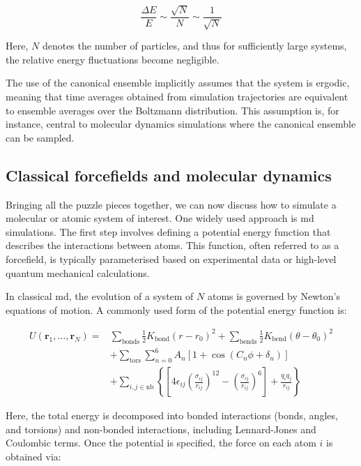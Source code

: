 \begin{equation}
    \frac{\Delta E}{E} \sim \frac{\sqrt{N}}{N} \sim \frac{1}{\sqrt{N}}
\end{equation}

Here, $N$ denotes the number of particles, and thus for sufficiently large systems, the relative energy fluctuations become negligible.

The use of the canonical ensemble implicitly assumes that the system is ergodic, meaning that time averages obtained from simulation trajectories are equivalent to ensemble averages over the Boltzmann distribution. This assumption is, for instance, central to molecular dynamics simulations where the canonical ensemble can be sampled.



\subsection{Classical forcefields and molecular dynamics}
Bringing all the puzzle pieces together, we can now discuss how to simulate a molecular or atomic system of interest. One widely used approach is \ac{md} simulations. The first step involves defining a potential energy function that describes the interactions between atoms. This function, often referred to as a forcefield, is typically parameterised based on experimental data or high-level quantum mechanical calculations.

In classical \ac{md}, the evolution of a system of $N$ atoms is governed by Newton's equations of motion. A commonly used form of the potential energy function is:

\begin{equation}
\begin{aligned}
    U(\mathbf{r}_1, \dots, \mathbf{r}_N) = &\sum_{\text{bonds}} \frac{1}{2} K_{\text{bond}} (r - r_0)^2 + 
    \sum_{\text{bends}} \frac{1}{2} K_{\text{bend}} (\theta - \theta_0)^2 \\
    &+ \sum_{\text{tors}} \sum_{n=0}^{6} A_n \left[ 1 + \cos(C_n \phi + \delta_n) \right] \\
    &+ \sum_{i,j \in \text{nb}} \left\{ \left[ 4\epsilon_{ij} \left( \frac{\sigma_{ij}}{r_{ij}} \right)^{12}
    - \left( \frac{\sigma_{ij}}{r_{ij}} \right)^6 \right] + \frac{q_i q_j}{r_{ij}} \right\}
\end{aligned}
\label{eq:md_potential}
\end{equation}

Here, the total energy is decomposed into bonded interactions (bonds, angles, and torsions) and non-bonded interactions, including Lennard-Jones and Coulombic terms. Once the potential is specified, the force on each atom $i$ is obtained via:


